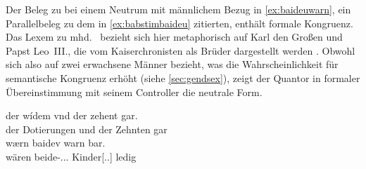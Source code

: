 

\label{phsec:baideuwarn}
Der Beleg zu  bei einem Neutrum mit männlichem Bezug in
\cref{ex:baideuwarn}, ein Parallelbeleg zu dem in \cref{ex:babstimbaideu}
zitierten, enthält formale Kongruenz. Das Lexem   zu
mhd.\  
\autocites[\pno~]{mwb1}[vgl.~auch][53]{kroonen2013} bezieht sich hier
metaphorisch auf Karl den Großen und Papst Leo~III., die vom Kaiserchronisten
als Brüder dargestellt werden
\autocites[14370]{schroeder1895}[vgl.][83]{weis2022}. Obwohl sich 
also auf zwei erwachsene Männer bezieht, was die Wahrscheinlichkeit für
semantische Kongruenz erhöht (siehe \cref{sec:gendsex}), zeigt der Quantor in
formaler Übereinstimmung mit seinem Controller die neutrale Form.

\begin{exe}
\ex \label{ex:baideuwarn}
	\gll der wídem vnd der zehent gar. \\
		der Dotierungen und der Zehnten gar \\
\sn \gll wærn baidev warn bar. \\ %
		wären beide-\Nom.\Pl.\NeutM.\St{} Kinder[\Nom.\Pl.\NeutM] ledig \\
	\begin{taggedline}{\parencites[\pno~75rb,3--4]{kc:C1}[vgl. abweichend][\pno~85vb,24]{kc:K}[][14384--14385]{schroeder1895}}
	\trans {}
	\end{taggedline}
\end{exe}

